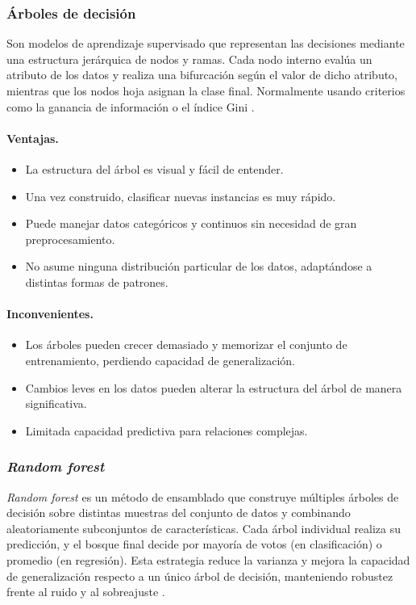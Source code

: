 \subsubsection{Árboles de decisión}
\label{subsubsec:arboles}

Son modelos de aprendizaje supervisado que representan las decisiones mediante una estructura jerárquica de nodos y ramas. Cada nodo interno evalúa un atributo de los datos y realiza una bifurcación según el valor de dicho atributo, mientras que los nodos hoja asignan la clase final. Normalmente usando criterios como la ganancia de información o el índice Gini \cite{dt_ibm}.

\paragraph*{\textbf{Ventajas.}}
\begin{itemize}
	\item La estructura del árbol es visual y fácil de entender.
	\item Una vez construido, clasificar nuevas instancias es muy rápido.
	\item Puede manejar datos categóricos y continuos sin necesidad de gran preprocesamiento.
	\item No asume ninguna distribución particular de los datos, adaptándose a distintas formas de patrones.
\end{itemize}

\paragraph*{\textbf{Inconvenientes.}}
\begin{itemize}
	\item Los árboles pueden crecer demasiado y memorizar el conjunto de entrenamiento, perdiendo capacidad de generalización.
	\item Cambios leves en los datos pueden alterar la estructura del árbol de manera significativa.
	\item Limitada capacidad predictiva para relaciones complejas.
\end{itemize}
\cite{dt_sklearn}

\subsubsection{\textit{Random forest}}
\label{subsubsec:randomforest}

\textit{Random forest} es un método de ensamblado que construye múltiples árboles de decisión sobre distintas muestras del conjunto de datos y combinando aleatoriamente subconjuntos de características. Cada árbol individual realiza su predicción, y el bosque final decide por mayoría de votos (en clasificación) o promedio (en regresión). Esta estrategia reduce la varianza y mejora la capacidad de generalización respecto a un único árbol de decisión, manteniendo robustez frente al ruido y al sobreajuste \cite{rf_sklearn}.

